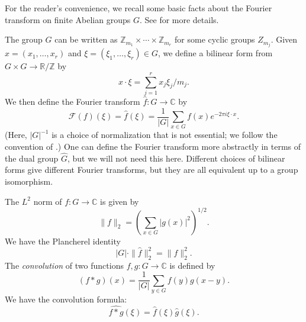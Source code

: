 \documentclass[12pt]{amsart}
\def\R{{\mathbb{R}}}
\def\Z{{\mathbb{Z}}}
\def\C{{\mathbb{C}}}
\numberwithin{theorem}{section}
\numberwithin{equation}{section}
\begin{document}
For the reader's convenience, we recall some basic facts about the Fourier transform on finite Abelian groups $G$. See \cite[Chapter 4]{TaoVu06} for more details.

The group $G$ can be written as $\Z_{m_1}\times\cdots\times \Z_{m_r}$ for some cyclic groups $Z_{m_j}$. Given $x=(x_1,\ldots,x_r)$ and $\xi=(\xi_1,\ldots,\xi_r)\in G$, we define a bilinear form from $G\times G\to \R/\Z$ by
\[
    x\cdot \xi = \sum_{j=1}^r x_j\xi_j/m_j.
\]
We then define the Fourier transform $\hat{f}:G\to \mathbb{C}$ by
\[
    \mathcal{F}(f)(\xi) = \hat{f}(\xi) = \frac{1}{|G|}\sum_{x\in G} f(x) e^{-2\pi i \xi\cdot x}.
\]
(Here, $|G|^{-1}$ is a choice of normalization that is not essential; we follow the convention of \cite{TaoVu06}.) One can define the Fourier transform more abstractly in terms of the dual group $\hat{G}$, but we will not need this here. Different choices of bilinear forms give different Fourier transforms, but they are all equivalent up to a group isomorphism.

The $L^2$ norm of $f:G\to\C$ is given by
\[
    \|f\|_2 = \left(\sum_{x\in G} |g(x)|^2\right)^{1/2}.
\]
We have the Plancherel identity
\[
    |G| \cdot \|\hat{f}\|_2^2 = \|f\|_2^2.
\]
The \emph{convolution} of two functions $f,g:G\to \mathbb{C}$ is defined by
\[
    (f*g)(x) = \frac{1}{|G|}\sum_{y\in G} f(y)g(x-y).
\]
We have the convolution formula:
\[
    \widehat{f*g}(\xi) = \hat{f}(\xi)\hat{g}(\xi).
\]
\end{document}
